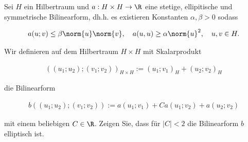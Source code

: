 
\begin{exercise}
Sei $H$ ein Hilbertraum und $a: H \times H \rightarrow \R$ eine stetige,
ellipitische und symmetrische Bilinearform, dh.h. es existieren Konstanten
$\alpha, \beta > 0$ sodass

\begin{align*}
  a(u;v)
  \leq
  \beta \norm{u}\norm{v},
  \quad
  a(u,u) \geq \alpha \norm{u}^2,
  \quad
  u,v \in H.
\end{align*}

Wir definieren auf dem Hilbertraum $H \times H$ mit Skalarprodukt

\begin{align*}
  ((u_1;u_2);(v_1;v_2))_{H \times H} := (u_1;v_1)_H + (u_2;v_2)_H
\end{align*}

die Bilinearform

\begin{align*}
  b((u_1;u_2);(v_1;v_2)) := a(u_1;v_1) + Ca(u_1;v_2) + a(u_2;v_2)
\end{align*}

mit einem beliebigen $C \in \R$. Zeigen Sie, dass für $|C| < 2$ die Bilinearform $b$
elliptisch ist.
\end{exercise}


\begin{solution}

\end{solution}

